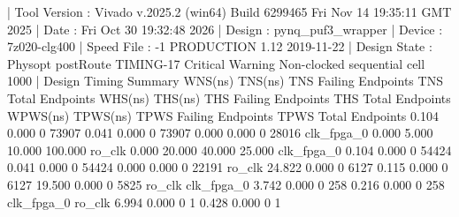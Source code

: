 \begin{codeblock}
| Tool Version : Vivado v.2025.2 (win64) Build 6299465 Fri Nov 14 19:35:11 GMT 2025
| Date         : Fri Oct 30 19:32:48 2026
| Design       : pynq_puf3_wrapper
| Device       : 7z020-clg400
| Speed File   : -1  PRODUCTION 1.12 2019-11-22
| Design State : Physopt postRoute
TIMING-17  Critical Warning  Non-clocked sequential cell                  1000        
| Design Timing Summary
    WNS(ns)      TNS(ns)  TNS Failing Endpoints  TNS Total Endpoints      WHS(ns)      THS(ns)  THS Failing Endpoints  THS Total Endpoints     WPWS(ns)     TPWS(ns)  TPWS Failing Endpoints  TPWS Total Endpoints  
      0.104        0.000                      0                73907        0.041        0.000                      0                73907        0.000        0.000                       0                 28016  
clk_fpga_0  {0.000 5.000}      10.000          100.000         
  ro_clk    {0.000 20.000}     40.000          25.000          
clk_fpga_0          0.104        0.000                      0                54424        0.041        0.000                      0                54424        0.000        0.000                       0                 22191  
  ro_clk           24.822        0.000                      0                 6127        0.115        0.000                      0                 6127       19.500        0.000                       0                  5825  
ro_clk        clk_fpga_0          3.742        0.000                      0                  258        0.216        0.000                      0                  258  
clk_fpga_0    ro_clk              6.994        0.000                      0                    1        0.428        0.000                      0                    1
\end{codeblock}
